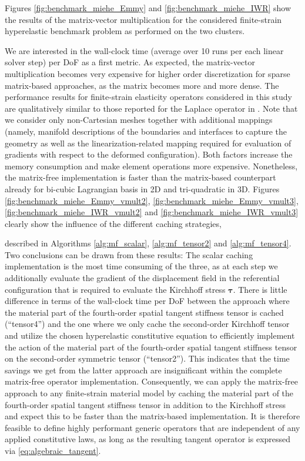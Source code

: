 \documentclass[times,doublespace]{nmeauth}
\def\gz  #1{           \mbox{$\boldsymbol{#1}$}}
\newcommand{\changeDD}[1]{#1}
\newcommand{\changeJP}[1]{#1}
\begin{document}
Figures \ref{fig:benchmark_miehe_Emmy} and \ref{fig:benchmark_miehe_IWR} show the results of the matrix-vector multiplication for the considered finite-strain hyperelastic benchmark problem as performed on the two clusters.
\changeDD{
We are interested in the wall-clock time (average over 10 runs per each linear solver step) per DoF as a first metric.}
As expected, the matrix-vector multiplication becomes very expensive for higher order discretization for sparse matrix-based approaches,
\changeDD{as the matrix becomes more and more dense.
The performance results for finite-strain elasticity operators considered in this study are qualitatively similar to those reported for the Laplace operator in \cite{kronbichler12}.
Note that we consider only non-Cartesian meshes together with additional mappings (namely, manifold descriptions of the boundaries and interfaces \cite{Arndt2017a} to capture the geometry as well as
the linearization-related mapping required for evaluation of gradients with respect to the deformed configuration).
Both factors increase the memory consumption and make element operations more expensive.
Nonetheless, }
the matrix-free implementation is faster than the matrix-based counterpart already for \changeJP{bi-cubic Lagrangian basis in 2D and tri-quadratic in 3D}.
Figures \ref{fig:benchmark_miehe_Emmy_vmult2}, \ref{fig:benchmark_miehe_Emmy_vmult3}, \ref{fig:benchmark_miehe_IWR_vmult2} and \ref{fig:benchmark_miehe_IWR_vmult3} clearly show the influence of the different caching strategies,
\changeDD{
described in Algorithms \ref{alg:mf_scalar}, \ref{alg:mf_tensor2} and \ref{alg:mf_tensor4}.}
Two conclusions can be drawn from these results:
The scalar caching implementation is the most time consuming of the three, as at each step we additionally evaluate the gradient of the displacement field in the referential configuration that is required to evaluate the Kirchhoff stress $\gz \tau$.
There is little difference \changeDD{in terms of the wall-clock time per DoF} between the approach where the material part of the fourth-order spatial tangent stiffness tensor is cached (``tensor4'') and the one where we only cache the second-order Kirchhoff tensor and utilize the chosen hyperelastic constitutive equation to efficiently implement the action of the material part of the fourth-order spatial tangent stiffness tensor on the second-order symmetric tensor (``tensor2'').
This indicates that the time savings we get from the latter approach are insignificant within the complete matrix-free operator implementation.
Consequently, we can apply the matrix-free approach to any finite-strain material model by caching the material part of the fourth-order spatial tangent stiffness tensor in addition to the Kirchhoff stress and expect this to be faster than the matrix-based implementation.
It is therefore feasible to define highly performant generic operators that are independent of any applied constitutive laws,
\changeDD{as long as the resulting tangent operator is expressed via \eqref{eq:algebraic_tangent}.}
\end{document}
